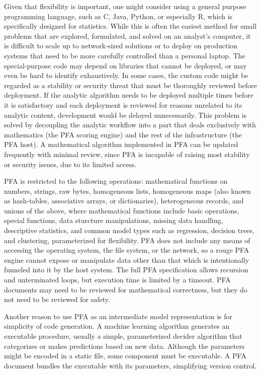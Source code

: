 \documentclass{article}
\theoremstyle{definition}
\begin{document}
Given that flexibility is important, one might consider using a general purpose programming language, such as C, Java, Python, or especially R, which is specifically designed for statistics.  While this is often the easiest method for small problems that are explored, formulated, and solved on an analyst's computer, it is difficult to scale up to network-sized solutions or to deploy on production systems that need to be more carefully controlled than a personal laptop.  The special-purpose code may depend on libraries that cannot be deployed, or may even be hard to identify exhaustively.  In some cases, the custom code might be regarded as a stability or security threat that must be thoroughly reviewed before deployment.  If the analytic algorithm needs to be deployed multiple times before it is satisfactory and each deployment is reviewed for reasons unrelated to its analytic content, development would be delayed unnecessarily.  This problem is solved by decoupling the analytic workflow into a part that deals exclusively with mathematics (the PFA scoring engine) and the rest of the infrastructure (the PFA host).  A mathematical algorithm implemented in PFA can be updated frequently with minimal review, since PFA is incapable of raising most stability or security issues, due to its limited access.

PFA is restricted to the following operations: mathematical functions on numbers, strings, raw bytes, homogeneous lists, homogeneous maps (also known as hash-tables, associative arrays, or dictionaries), heterogeneous records, and unions of the above, where mathematical functions include basic operations, special functions, data sturcture manipulations, missing data handling, descriptive statistics, and common model types such as regression, decision trees, and clustering, parameterized for flexibility.  PFA does not include any means of accessing the operating system, the file system, or the network, so a rouge PFA engine cannot expose or manipulate data other than that which is intentionally funneled into it by the host system.  The full PFA specification allows recursion and unterminated loops, but execution time is limited by a timeout.  PFA documents may need to be reviewed for mathematical correctness, but they do not need to be reviewed for safety.

Another reason to use PFA as an intermediate model representation is for simplicity of code generation.  A machine learning algorithm generates an executable procedure, usually a simple, parameterized decider algorithm that categorizes or makes predictions based on new data.  Although the parameters might be encoded in a static file, some component must be executable.  A PFA document bundles the executable with its parameters, simplifying version control.
\end{document}
